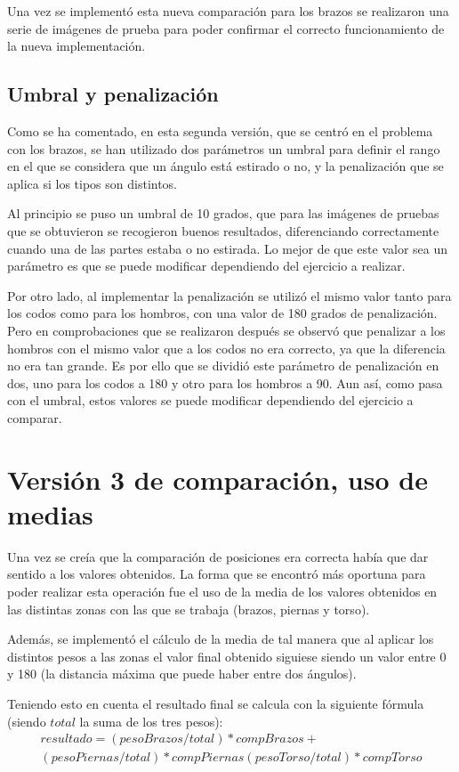 Una vez se implementó esta nueva comparación para los brazos se realizaron una serie de imágenes de prueba para poder confirmar el correcto funcionamiento de la nueva implementación.

\subsection{Umbral y penalización}
Como se ha comentado, en esta segunda versión, que se centró en el problema con los brazos, se han utilizado dos parámetros un umbral para definir el rango en el que se considera que un ángulo está estirado o no, y la penalización que se aplica si los tipos son distintos.

Al principio se puso un umbral de 10 grados, que para las imágenes de pruebas que se obtuvieron se recogieron buenos resultados, diferenciando correctamente cuando una de las partes estaba o no estirada. Lo mejor de que este valor sea un parámetro es que se puede modificar dependiendo del ejercicio a realizar.

Por otro lado, al implementar la penalización se utilizó el mismo valor tanto para los codos como para los hombros, con una valor de 180 grados de penalización. Pero en comprobaciones que se realizaron después se observó que penalizar a los hombros con el mismo valor que a los codos no era correcto, ya que la diferencia no era tan grande. Es por ello que se dividió este parámetro de penalización en dos, uno para los codos a 180 y otro para los hombros a 90. Aun así, como pasa con el umbral, estos valores se puede modificar dependiendo del ejercicio a comparar.

\section{Versión 3 de comparación, uso de medias}
Una vez se creía que la comparación de posiciones era correcta había que dar sentido a los valores obtenidos. La forma que se encontró más oportuna para poder realizar esta operación fue el uso de la media de los valores obtenidos en las distintas zonas con las que se trabaja (brazos, piernas y torso).

Además, se implementó el cálculo de la media de tal manera que al aplicar los distintos pesos a las zonas el valor final obtenido siguiese siendo un valor entre 0 y 180 (la distancia máxima que puede haber entre dos ángulos).

Teniendo esto en cuenta el resultado final se calcula con la siguiente fórmula (siendo $total$ la suma de los tres pesos):
\begin{equation}
\begin{split}
resultado = (pesoBrazos/total)*compBrazos +\\ (pesoPiernas/total)*compPiernas (pesoTorso/total)*compTorso
\end{split}
\end{equation}

